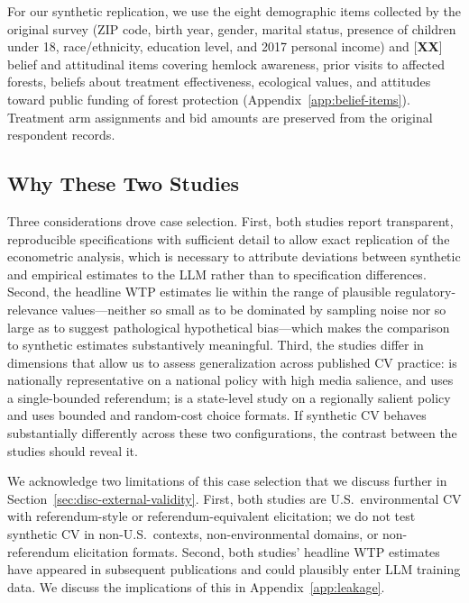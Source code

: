 \documentclass[12pt]{article}
\begin{document}
For our synthetic replication, we use the eight demographic items
collected by the original survey (ZIP code, birth year, gender, marital
status, presence of children under 18, race/ethnicity, education level,
and 2017 personal income) and [\textbf{XX}] belief and attitudinal items
covering hemlock awareness, prior visits to affected forests, beliefs
about treatment effectiveness, ecological values, and attitudes toward
public funding of forest protection (Appendix~\ref{app:belief-items}).
Treatment arm assignments and bid amounts are preserved from the original
respondent records.

\subsection{Why These Two Studies}\label{sec:data-why}

Three considerations drove case selection. First, both studies report
transparent, reproducible specifications with sufficient detail to allow
exact replication of the econometric analysis, which is necessary to
attribute deviations between synthetic and empirical estimates to the LLM
rather than to specification differences. Second, the headline WTP
estimates lie within the range of plausible regulatory-relevance
values---neither so small as to be dominated by sampling noise nor so
large as to suggest pathological hypothetical bias---which makes the
comparison to synthetic estimates substantively meaningful. Third, the
studies differ in dimensions that allow us to assess generalization
across published CV practice: \textcite{Aldy2012} is nationally
representative on a national policy with high media salience, and uses a
single-bounded referendum; \textcite{Giguere2020} is a state-level study
on a regionally salient policy and uses bounded and random-cost choice
formats. If synthetic CV behaves substantially differently across these
two configurations, the contrast between the studies should reveal it.

We acknowledge two limitations of this case selection that we discuss
further in Section~\ref{sec:disc-external-validity}. First, both studies
are U.S.\ environmental CV with referendum-style or referendum-equivalent
elicitation; we do not test synthetic CV in non-U.S.\ contexts,
non-environmental domains, or non-referendum elicitation formats. Second,
both studies' headline WTP estimates have appeared in subsequent
publications and could plausibly enter LLM training data. We discuss the
implications of this in Appendix~\ref{app:leakage}.
\end{document}
